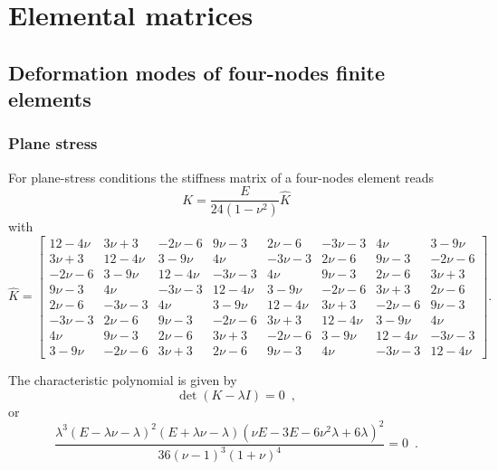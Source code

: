 \chapter{Elemental matrices}

\section{Deformation modes of four-nodes finite elements}

\subsection{Plane stress}
For plane-stress conditions the stiffness matrix of a four-nodes element reads
\begin{equation}
  K = \frac{E}{24(1 - \nu^2)} \hat{K}
\end{equation}
with
\begin{equation}
  \hat{K} = 
  \begin{bmatrix}
    12 - 4\nu & 3 \nu + 3 & - 2 \nu - 6 & 9 \nu - 3 & 2 \nu - 6 & - 3 \nu - 3 & 4 \nu & 3 - 9\nu\\
    3 \nu + 3 & 12 - 4\nu & 3 - 9\nu & 4 \nu & - 3 \nu - 3 & 2 \nu - 6 & 9 \nu - 3 & - 2 \nu - 6\\
    - 2 \nu - 6 & 3 - 9\nu & 12 - 4\nu & - 3 \nu - 3 & 4 \nu & 9 \nu - 3 & 2 \nu - 6 & 3 \nu + 3\\
    9 \nu - 3 & 4 \nu & - 3 \nu - 3 & 12 - 4\nu & 3 - 9\nu & - 2 \nu - 6 & 3 \nu + 3 & 2 \nu - 6\\
    2 \nu - 6 & - 3 \nu - 3 & 4 \nu & 3 - 9\nu & 12 - 4\nu & 3 \nu + 3 & - 2 \nu - 6 & 9 \nu - 3\\
    - 3 \nu - 3 & 2 \nu - 6 & 9 \nu - 3 & - 2 \nu - 6 & 3 \nu + 3 & 12 - 4\nu & 3 - 9\nu & 4 \nu\\
    4 \nu & 9 \nu - 3 & 2 \nu - 6 & 3 \nu + 3 & - 2 \nu - 6 & 3 - 9\nu & 12 - 4\nu & - 3 \nu - 3\\
    3 - 9\nu & - 2 \nu - 6 & 3 \nu + 3 & 2 \nu - 6 & 9 \nu - 3 & 4 \nu & - 3 \nu - 3 & 12 - 4\nu
  \end{bmatrix} .
  \label{eq:stiff}
\end{equation}

The characteristic polynomial is given by
\[\det(K - \lambda I)= 0\enspace ,\]
or
\begin{equation}
  \frac{\lambda^3(E - \lambda\nu - \lambda)^2 (E + \lambda \nu - \lambda) (\nu E - 3E - 6\nu^2\lambda + 6\lambda)^2}{36 (\nu - 1)^3 (1 + \nu)^4} = 0 \enspace .
\end{equation}

